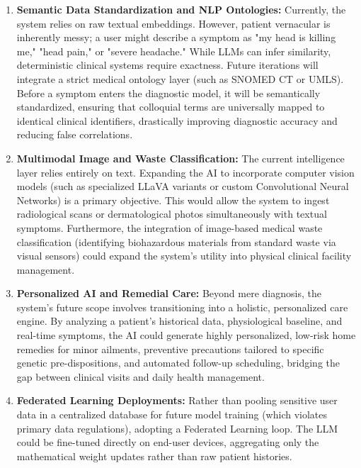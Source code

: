 \documentclass[12pt]{article}
\begin{document}
\begin{enumerate}
    \item \textbf{Semantic Data Standardization and NLP Ontologies:} Currently, the system relies on raw textual embeddings. However, patient vernacular is inherently messy; a user might describe a symptom as "my head is killing me," "head pain," or "severe headache." While LLMs can infer similarity, deterministic clinical systems require exactness. Future iterations will integrate a strict medical ontology layer (such as SNOMED CT or UMLS). Before a symptom enters the diagnostic model, it will be semantically standardized, ensuring that colloquial terms are universally mapped to identical clinical identifiers, drastically improving diagnostic accuracy and reducing false correlations.
    
    \item \textbf{Multimodal Image and Waste Classification:} The current intelligence layer relies entirely on text. Expanding the AI to incorporate computer vision models (such as specialized LLaVA variants or custom Convolutional Neural Networks) is a primary objective. This would allow the system to ingest radiological scans or dermatological photos simultaneously with textual symptoms. Furthermore, the integration of image-based medical waste classification (identifying biohazardous materials from standard waste via visual sensors) could expand the system's utility into physical clinical facility management.
    
    \item \textbf{Personalized AI and Remedial Care:} Beyond mere diagnosis, the system's future scope involves transitioning into a holistic, personalized care engine. By analyzing a patient's historical data, physiological baseline, and real-time symptoms, the AI could generate highly personalized, low-risk home remedies for minor ailments, preventive precautions tailored to specific genetic pre-dispositions, and automated follow-up scheduling, bridging the gap between clinical visits and daily health management.
    
    \item \textbf{Federated Learning Deployments:} Rather than pooling sensitive user data in a centralized database for future model training (which violates primary data regulations), adopting a Federated Learning loop. The LLM could be fine-tuned directly on end-user devices, aggregating only the mathematical weight updates rather than raw patient histories.
\end{enumerate}
\end{document}
